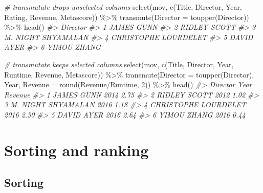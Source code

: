 \documentclass[
]{book}
\newenvironment{Shaded}{\begin{snugshade}}{\end{snugshade}}
\newcommand{\AttributeTok}[1]{\textcolor[rgb]{0.77,0.63,0.00}{#1}}
\newcommand{\CommentTok}[1]{\textcolor[rgb]{0.56,0.35,0.01}{\textit{#1}}}
\newcommand{\DecValTok}[1]{\textcolor[rgb]{0.00,0.00,0.81}{#1}}
\newcommand{\FunctionTok}[1]{\textcolor[rgb]{0.00,0.00,0.00}{#1}}
\newcommand{\NormalTok}[1]{#1}
\newcommand{\SpecialCharTok}[1]{\textcolor[rgb]{0.00,0.00,0.00}{#1}}
\begin{document}
\begin{Shaded}
\begin{Highlighting}[]
\CommentTok{\# transmutate drops unselected columns}
\FunctionTok{select}\NormalTok{(mov, }\FunctionTok{c}\NormalTok{(Title, Director, Year, Rating, Revenue, Metascore)) }\SpecialCharTok{\%\textgreater{}\%}
  \FunctionTok{transmute}\NormalTok{(}\AttributeTok{Director =} \FunctionTok{toupper}\NormalTok{(Director)) }\SpecialCharTok{\%\textgreater{}\%}
  \FunctionTok{head}\NormalTok{()}
\CommentTok{\#\textgreater{}               Director}
\CommentTok{\#\textgreater{} 1           JAMES GUNN}
\CommentTok{\#\textgreater{} 2         RIDLEY SCOTT}
\CommentTok{\#\textgreater{} 3   M. NIGHT SHYAMALAN}
\CommentTok{\#\textgreater{} 4 CHRISTOPHE LOURDELET}
\CommentTok{\#\textgreater{} 5           DAVID AYER}
\CommentTok{\#\textgreater{} 6          YIMOU ZHANG}

\CommentTok{\# transmutate keeps selected columns}
\FunctionTok{select}\NormalTok{(mov, }\FunctionTok{c}\NormalTok{(Title, Director, Year, Runtime, Revenue, Metascore)) }\SpecialCharTok{\%\textgreater{}\%}
  \FunctionTok{transmute}\NormalTok{(}\AttributeTok{Director =} \FunctionTok{toupper}\NormalTok{(Director), }
\NormalTok{            Year,}
            \AttributeTok{Revenue =} \FunctionTok{round}\NormalTok{(Revenue}\SpecialCharTok{/}\NormalTok{Runtime, }\DecValTok{2}\NormalTok{)) }\SpecialCharTok{\%\textgreater{}\%}
\FunctionTok{head}\NormalTok{()}
\CommentTok{\#\textgreater{}               Director Year Revenue}
\CommentTok{\#\textgreater{} 1           JAMES GUNN 2014    2.75}
\CommentTok{\#\textgreater{} 2         RIDLEY SCOTT 2012    1.02}
\CommentTok{\#\textgreater{} 3   M. NIGHT SHYAMALAN 2016    1.18}
\CommentTok{\#\textgreater{} 4 CHRISTOPHE LOURDELET 2016    2.50}
\CommentTok{\#\textgreater{} 5           DAVID AYER 2016    2.64}
\CommentTok{\#\textgreater{} 6          YIMOU ZHANG 2016    0.44}
\end{Highlighting}
\end{Shaded}

\hypertarget{sorting-and-ranking-1}{%
\section{Sorting and ranking}\label{sorting-and-ranking-1}}

\hypertarget{tr-sort}{%
\subsection{Sorting}\label{tr-sort}}
\end{document}
